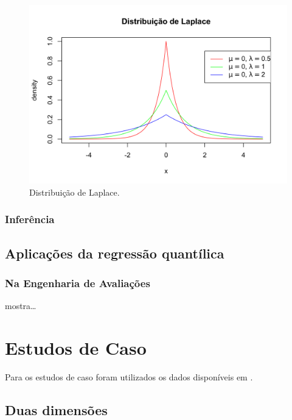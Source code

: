 \documentclass[a4paper, 12pt]{article}
\begin{document}
\begin{minipage}{0.5\textwidth}
\begin{figure}[H]

{\centering \includegraphics[width=0.7\linewidth]{images/dist_Laplace-1} 

}

\caption{Distribuição de Laplace.}\label{fig:dist_Laplace}
\end{figure}
\end{minipage}

\hypertarget{inferencia}{%
\subsubsection{Inferência}\label{inferencia}}

\hypertarget{aplicacoes-da-regressao-quantilica}{%
\subsection{Aplicações da regressão
quantílica}\label{aplicacoes-da-regressao-quantilica}}

\hypertarget{na-engenharia-de-avaliacoes}{%
\subsubsection{Na Engenharia de
Avaliações}\label{na-engenharia-de-avaliacoes}}

\textcite{Zietz} mostra\ldots{}

\hypertarget{estudos-de-caso}{%
\section{Estudos de Caso}\label{estudos-de-caso}}

Para os estudos de caso foram utilizados os dados disponíveis em
\textcite{hochheim}.

\hypertarget{duas-dimensoes}{%
\subsection{Duas dimensões}\label{duas-dimensoes}}
\end{document}
